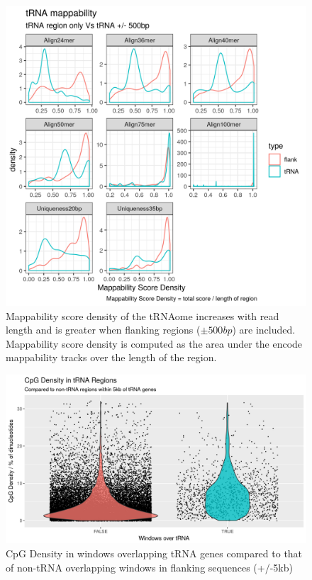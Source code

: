 \documentclass[]{book}
\begin{document}
\begin{figure}

{\centering \includegraphics[width=1\linewidth]{./figs/mappabilityScoreDensity_tRNAVsFlank500} 

}

\caption{Mappability score density of the tRNAome increases with read length and is greater when flanking regions (\(\pm500bp\)) are included. Mappability score density is computed as the area under the encode mappability tracks \citep{Derrien2012} over the length of the region.}\label{fig:mappabilityScoreDensity}
\end{figure}



\begin{figure}

{\centering \includegraphics[width=1\linewidth]{figs/CpGcountBGvstRNAPlot} 

}

\caption{CpG Density in windows overlapping tRNA genes compared to that of non-tRNA overlapping windows in flanking sequences (+/-5kb)}\label{fig:CpGcountBGvstRNAPlot}
\end{figure}
\end{document}
